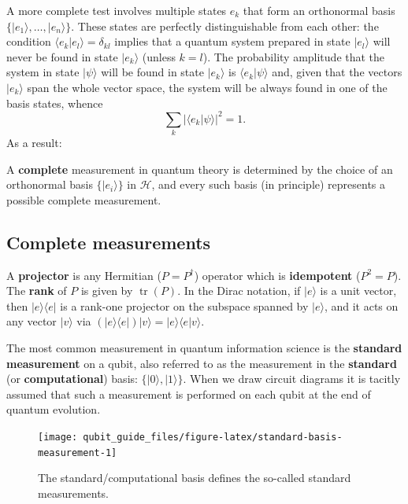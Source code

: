 \documentclass[fleqn,a4paper]{article}
\newenvironment{idea}{\everypar{\setlength{\parindent}{1.5em}}}{}
\theoremstyle{definition}
\theoremstyle{definition}
\theoremstyle{definition}
\theoremstyle{definition}
\theoremstyle{remark}
\begin{document}
A more complete test involves multiple states \(e_k\) that form an orthonormal basis \(\{|e_1\rangle,\ldots,|e_n\rangle\}\).
These states are perfectly distinguishable from each other: the condition \(\langle e_k|e_l\rangle = \delta_{kl}\) implies that a quantum system prepared in state \(|e_l\rangle\) will never be found in state \(|e_k\rangle\) (unless \(k=l\)).
The probability amplitude that the system in state \(|\psi\rangle\) will be found in state \(|e_k\rangle\) is \(\langle e_k|\psi\rangle\) and, given that the vectors \(|e_k\rangle\) span the whole vector space, the system will be always found in one of the basis states, whence
\[
  \sum_k |\langle e_k|\psi\rangle|^2 = 1.
\]
As a result:

\begin{idea}
A \textbf{complete} measurement in quantum theory is determined by the choice of an orthonormal basis \(\{|e_i\rangle\}\) in \(\mathcal{H}\), and every such basis (in principle) represents a possible complete measurement.

\end{idea}

\hypertarget{complete-measurements}{%
\subsection{Complete measurements}\label{complete-measurements}}

\begin{idea}
A \textbf{projector} is any Hermitian (\(P=P^\dagger\)) operator which is \textbf{idempotent} (\(P^2=P\)).
The \textbf{rank} of \(P\) is given by \(\operatorname{tr}(P)\).
In the Dirac notation, if \(|e\rangle\) is a unit vector, then \(|e\rangle\langle e|\) is a rank-one projector on the subspace spanned by \(|e\rangle\), and it acts on any vector \(|v\rangle\) via \((|e\rangle\langle e|)|v\rangle = |e\rangle\langle e|v\rangle\).

\end{idea}

The most common measurement in quantum information science is the \textbf{standard measurement} on a qubit, also referred to as the measurement in the \textbf{standard} (or \textbf{computational}) basis: \(\{|0\rangle,|1\rangle\}\).
When we draw circuit diagrams it is tacitly assumed that such a measurement is performed on each qubit at the end of quantum evolution.

\begin{figure}[H]

{\centering \texttt{[image: qubit\_guide\_files/figure-latex/standard-basis-measurement-1]} 

}

\caption{The standard/computational basis defines the so-called standard measurements.}\label{fig:standard-basis-measurement}
\end{figure}
\end{document}
